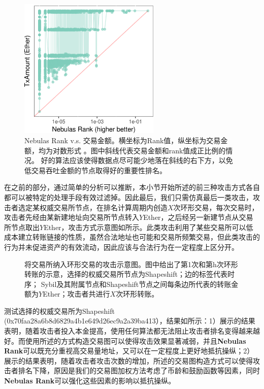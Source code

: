 \begin{figure}[!htbp]
	\centering
	\captionsetup{width=\linewidth}
	\includegraphics[width=0.60\textwidth]{figs/MAY_lr.png}
  \caption{Nebulas Rank v.s.
    交易金额。\small{横坐标为Rank值，纵坐标为交易金额，均为对数形式
      。图中斜线代表交易金额和rank值成正比例的情况。
      好的算法应该使得数据点尽可能少地落在斜线的右下方，以免低交易吞吐金额的节点取得好的重要性排名。}}
      \label{fig:nrio}
\end{figure}


在之前的部分，通过简单的分析可以推断，本小节开始所述的前三种攻击方式各自都可以被特定的处理手段有效过滤掉。因此最后，我们只需仿真最后一类攻击，攻击者选定某权威交易所节点，在排名计算周期内创造$X$次环形交易，每次交易时，攻击者先经由某新建地址向交易所节点转入$Y$Ether，之后经另一新建节点从交易所节点取出$Y$Ether，攻击方式示意图如所示。此类攻击利用了某些交易所可以低成本建立转账链接的性质，虽然合法地址也可能和交易所频繁交易，但此类攻击的行为并未促进资产的有效流动，因此应该与合法行为在一定程度上区分开。

\begin{figure}[!ht]
	\centering
  
  \caption{将交易所纳入环形交易的攻击示意图。\small{图中给出了第1次和第h次环形转账的示意，选择的权威交易所节点为Shapeshift；边的标签代表时序； Sybil及其附属节点和Shapeshift节点之间每条边所代表的转账金额为$Y$Ether；攻击者共进行$X$次环形转账。}}\label{fig:loop}
\end{figure}

\newpage 

测试选择的权威交易所为Shapeshift (0x70faa28a6b8d6829a4b1e649d26ec9a2a39ba413），结果如所示：1）展示的结果表明，随着攻击者投入本金提高，使用任何算法都无法阻止攻击者排名变得越来越好。而使用所述的方式构造交易图可以使得攻击效果显著减弱，并且\textbf{Nebulas Rank}可以既充分重视高交易量地址，又可以在一定程度上更好地抵抗操纵；2）展示的结果表明，随着攻击者攻击次数的增加，所述的交易图构造方式可以使得攻击者排名下降，原因是我们的交易图加权方法考虑了币龄和鼓励函数等因素，同时\textbf{Nebulas Rank}可以强化这些因素的影响以抵抗操纵。


